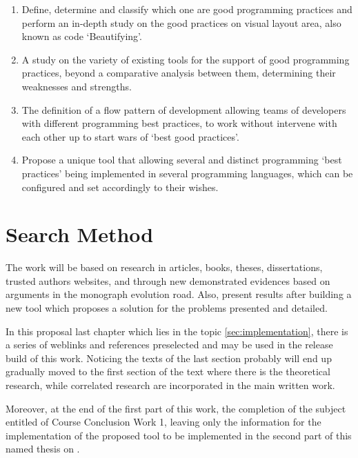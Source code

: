 \begin{englishtext}
\begin{enumerate}
        \item Define, determine and classify which one are good programming
        practices and perform an in-depth study on the good practices on visual
        layout area, also known as code `Beautifying'.

        \item A study on the variety of existing tools for the support of good
        programming practices, beyond a comparative analysis between them,
        determining their weaknesses and strengths.

        \item The definition of a flow pattern of development allowing teams of
        developers with different programming best practices, to work without
        intervene with each other up to start wars of `best good practices'.

        \item Propose a unique tool that allowing several and distinct
        programming `best practices' being implemented in several programming
        languages, which can be configured and set accordingly to their wishes.
    \end{enumerate}



    \section{Search Method}

    The work will be based on research in articles, books, theses,
    dissertations, trusted authors websites, and through new demonstrated
    evidences based on arguments in the monograph evolution road. Also, present
    results after building a new tool which proposes a solution for the problems
    presented and detailed. \cite{aspectOriented}

    In this proposal last chapter which lies in the topic
    \autoref{sec:implementation}, there is a series of weblinks and references
    preselected and may be used in the release build of this work. Noticing the
    texts of the last section probably will end up gradually moved to the first
    section of the text where there is the theoretical research, while
    correlated research are incorporated in the main written work.
    \cite{aspectOrientationReview}

    Moreover, at the end of the first part of this work, the completion of the
    subject entitled of Course Conclusion Work 1, leaving only the information
    for the implementation of the proposed tool to be implemented in the second
    part of this named thesis on .




\end{englishtext}
